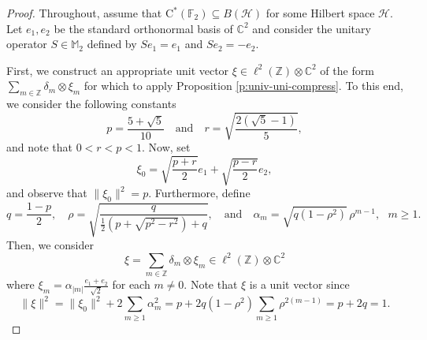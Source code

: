 \documentclass[10pt,a4paper]{amsart}
\newcommand{\bC}{{\mathbb{C}}}
\newcommand{\bF}{{\mathbb{F}}}
\newcommand{\bM}{{\mathbb{M}}}
\newcommand{\bZ}{{\mathbb{Z}}}
\newcommand{\rC}{\mathrm{C}}
\renewcommand{\H}{{\mathcal{H}}}
\begin{document}
\begin{proof}
    Throughout, assume that $\rC^*(\bF_2)\subseteq B(\H)$ for some Hilbert space $\H$. Let $e_1, e_2$ be the standard orthonormal basis of $\bC^2$ and consider the unitary operator $S\in \bM_2$ defined by $Se_1=e_1$ and $Se_2=-e_2$.
    
    First, we construct an appropriate unit vector $\xi\in\ell^2(\bZ)\otimes\bC^2$ of the form $\sum_{m\in\bZ} \delta_m\otimes\xi_m$ for which to apply Proposition \ref{p:univ-uni-compress}. To this end, we consider the following constants
    \[
        p=\frac{5+\sqrt5}{10} \quad \text{and} \quad r=\sqrt{\frac{2(\sqrt5-1)}{5}},
    \]
    and note that $0<r<p<1$. Now, set
    \[
        \xi_0 = \sqrt{\frac{p+r}{2}}e_1 + \sqrt{\frac{p-r}{2}}e_2,
    \]
    and observe that $\|\xi_0\|^2 = p$. Furthermore, define
    \[
        q=\frac{1-p}{2}, \quad \rho=\sqrt{\frac{q}{\frac{1}{2}(p+\sqrt{p^2-r^2})+q}}, \quad \text{and} \quad \alpha_m = \sqrt{q(1-\rho^2)}\,\rho^{m-1}, \ \ \ m\geq 1.
    \]
    Then, we consider
    \[
        \xi=\sum_{m\in\bZ}\delta_m\otimes \xi_m\in \ell^2(\bZ)\otimes\bC^2
    \]
    where $\xi_m = \alpha_{|m|}\frac{e_1+e_2}{\sqrt2}$ for each $m\neq 0$. Note that $\xi$ is a unit vector since
    \[
        \|\xi\|^2 = \|\xi_0\|^2 +2\sum_{m\geq1}\alpha_m^2 = p + 2q(1-\rho^2)\sum_{m\geq1}\rho^{2(m-1)} = p+2q = 1.
    \]


\end{proof}
\end{document}
